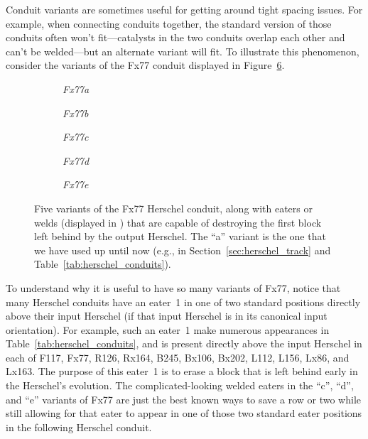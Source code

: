 Conduit variants are sometimes useful for getting around tight spacing issues. For example, when connecting conduits together, the standard version of those conduits often won't fit---catalysts in the two conduits overlap each other and can't be welded---but an alternate variant will fit. To illustrate this phenomenon, consider the variants of the Fx77 conduit displayed in Figure~\ref{fig:fx77_variants}.

\begin{figure}[!htb]
	\centering
	\begin{subfigure}{.18\textwidth}
		\centering
		\caption{\emph{Fx77a}}
		\label{fig:fx77_a}
	\end{subfigure}\quad%
	\begin{subfigure}{.18\textwidth}
		\centering
		\caption{\emph{Fx77b}}
		\label{fig:fx77_b}
	\end{subfigure}\quad%
	\begin{subfigure}{.18\textwidth}
		\centering
		\caption{\emph{Fx77c}}
		\label{fig:fx77_c}
	\end{subfigure}\quad%
	\begin{subfigure}{.18\textwidth}
		\centering
		\caption{\emph{Fx77d}}
		\label{fig:fx77_d}
	\end{subfigure}\quad%
	\begin{subfigure}{.18\textwidth}
		\centering
		\caption{\emph{Fx77e}}
		\label{fig:fx77_e}
	\end{subfigure}
	\caption{Five variants of the Fx77 Herschel conduit, along with eaters or welds (displayed in ) that are capable of destroying the first block left behind by the output Herschel. The ``a'' variant is the one that we have used up until now (e.g., in Section~\ref{sec:herschel_track} and Table~\ref{tab:herschel_conduits}).}\label{fig:fx77_variants}
\end{figure}

To understand why it is useful to have so many variants of Fx77, notice that many Herschel conduits have an eater~1 in one of two standard positions directly above their input Herschel (if that input Herschel is in its canonical input orientation). For example, such an eater~1 make numerous appearances in Table~\ref{tab:herschel_conduits}, and is present directly above the input Herschel in each of F117, Fx77, R126, Rx164, B245, Bx106, Bx202, L112, L156, Lx86, and Lx163. The purpose of this eater~1 is to erase a block that is left behind early in the Herschel's evolution. The complicated-looking welded eaters in the ``c'', ``d'', and ``e'' variants of Fx77 are just the best known ways to save a row or two while still allowing for that eater to appear in one of those two standard eater positions in the following Herschel conduit.

